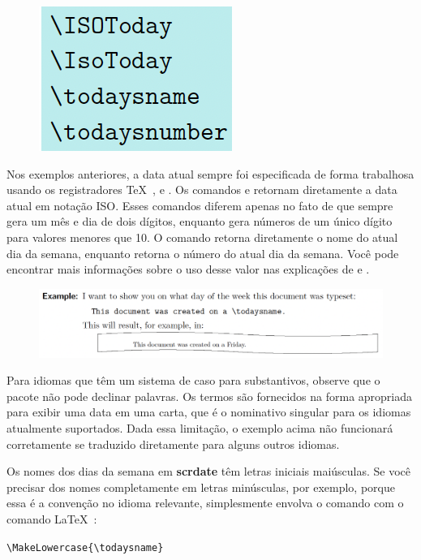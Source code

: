 \begin{figure}[ht]
\includegraphics[width=0.25\linewidth]{imagens/imagem12.png}
\end{figure}
\newpage
Nos exemplos anteriores, a data atual sempre foi especificada de forma trabalhosa usando os registradores \TeX\ ,  e . Os comandos  e  retornam diretamente a data atual em notação ISO. Esses comandos diferem apenas no fato de que  sempre gera um mês e dia de dois dígitos, enquanto  gera números de um único dígito para valores menores que 10. O comando  retorna diretamente o nome do atual dia da semana, enquanto  retorna o número do atual dia da semana. Você pode encontrar mais informações sobre o uso desse valor nas explicações de  e .

\begin{figure}[h]
    \centering
    \includegraphics[width=1\linewidth]{imagens/imagem13.png}
\end{figure}

Para idiomas que têm um sistema de caso para substantivos, observe que o pacote não pode declinar palavras. Os termos são fornecidos na forma apropriada para exibir uma data em uma carta, que é o nominativo singular para os idiomas atualmente suportados. Dada essa limitação, o exemplo acima não funcionará corretamente se traduzido diretamente para alguns outros idiomas.

Os nomes dos dias da semana em \textbf{scrdate} têm letras iniciais maiúsculas. Se você precisar dos nomes completamente em letras minúsculas, por exemplo, porque essa é a convenção no idioma relevante, simplesmente envolva o comando com o comando \LaTeX\ :

\verb|\MakeLowercase{\todaysname}|